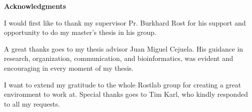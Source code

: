 \clearemptydoublepage
{}
{}



\vspace*{2cm}

\begin{center}
{\Large \bf Acknowledgments}
\end{center}

\vspace{1cm}




I would first like to thank my supervisor Pr. Burkhard Rost for his support and opportunity to do my master's thesis in his group.

A great thanks goes to my thesis advisor Juan Miguel Cejuela. His guidance in research, organization, communication, and bioinformatics, was evident and encouraging in every moment of my thesis.

I want to extend my gratitude to the whole Rostlab group for creating a great environment to work at. Special thanks goes to Tim Karl, who kindly responded to all my requests.
